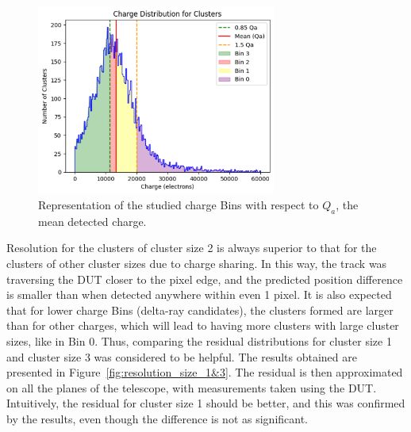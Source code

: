 \begin{figure}[H]
    \centering
    \includegraphics[width=0.7\textwidth]{images/Bins.png}
    \caption{Representation of the studied charge Bins with respect to \( Q_a \), the mean detected charge.}
    \label{fig:charge_bins}
\end{figure}

Resolution for the clusters of cluster size 2 is always superior to that for the clusters of other cluster sizes due to charge sharing. In this way, the track was traversing the DUT closer to the pixel edge, and the predicted position difference is smaller than when detected anywhere within even 1 pixel. It is also expected that for lower charge Bins (delta-ray candidates), the clusters formed are larger than for other charges, which will lead to having more clusters with large cluster sizes, like in Bin 0. Thus, comparing the residual distributions for cluster size 1 and cluster size 3 was considered to be helpful. The results obtained are presented in Figure~\ref{fig:resolution_size_1&3}. The residual is then approximated on all the planes of the telescope, with measurements taken using the DUT. Intuitively, the residual for cluster size 1 should be better, and this was confirmed by the results, even though the difference is not as significant.

